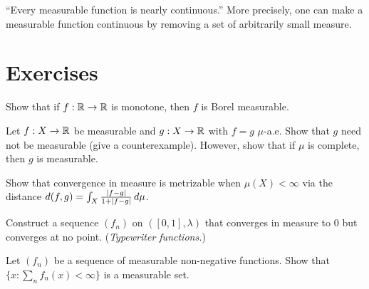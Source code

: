 \begin{intuition}[title=\textbf{Interpretation of Lusin's theorem}]
``Every measurable function is nearly continuous.'' More precisely, one can make a
measurable function continuous by removing a set of arbitrarily small measure.
\end{intuition}

\section{Exercises}

\begin{exercise}
Show that if $f : \mathbb{R} \to \mathbb{R}$ is monotone, then $f$ is Borel measurable.
\end{exercise}

\begin{exercise}
Let $f : X \to \mathbb{R}$ be measurable and $g : X \to \mathbb{R}$ with $f = g$ $\mu$-a.e. Show
that $g$ need not be measurable (give a counterexample). However, show that if $\mu$
is complete, then $g$ is measurable.
\end{exercise}

\begin{exercise}
Show that convergence in measure is metrizable when $\mu(X) < \infty$ via the
distance $d(f, g) = \int_X \frac{\left| f - g \right|}{1 + \left| f - g \right|}\, d\mu$.
\end{exercise}

\begin{exercise}
Construct a sequence $(f_n)$ on $([0,1], \lambda)$ that converges in measure to $0$
but converges at no point. (\emph{Typewriter functions.})
\end{exercise}

\begin{exercise}
Let $(f_n)$ be a sequence of measurable non-negative functions. Show that
$\{x : \sum_n f_n(x) < \infty\}$ is a measurable set.
\end{exercise}
